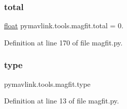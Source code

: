 \subsubsection{\texorpdfstring{total}{total}}
{\footnotesize\ttfamily \mbox{\hyperlink{namespacepymavlink_1_1tools_1_1magfit_ae9ebf0687869ceb9dd1551f626a903eb}{float}} pymavlink.\+tools.\+magfit.\+total = 0.}



Definition at line 170 of file magfit.\+py.

\mbox{\label{namespacepymavlink_1_1tools_1_1magfit_a1df98baf6bc890d12b6fb2ff30f4da46}} 
\subsubsection{\texorpdfstring{type}{type}}
{\footnotesize\ttfamily pymavlink.\+tools.\+magfit.\+type}



Definition at line 13 of file magfit.\+py.

